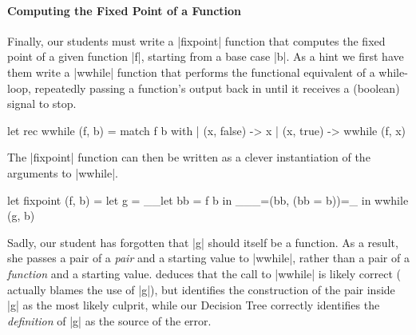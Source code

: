 \paragraph{Computing the Fixed Point of a Function}
Finally, our students must write a |fixpoint| function that computes the
fixed point of a given function |f|, starting from a base case |b|.
%
As a hint we first have them write a |wwhile| function that performs the
functional equivalent of a while-loop, repeatedly passing a function's
output back in until it receives a (boolean) signal to stop.
%
\begin{ecode}
  let rec wwhile (f, b) =
    match f b with
    | (x, false) -> x
    | (x, true)  -> wwhile (f, x)
\end{ecode}
\lstset{firstnumber=last}
%
The |fixpoint| function can then be written as a clever instantiation of
the arguments to |wwhile|.
%
\begin{ecode}
  let fixpoint (f, b) =
    let g = __let bb = f b in ___=(bb, (bb = b))=_ in
    wwhile (g, b)
\end{ecode}
\lstset{firstnumber=1}
%
Sadly, our student has forgotten that |g| should itself be a function.
%
As a result, she passes a pair of a \emph{pair} and a starting value to
|wwhile|, rather than a pair of a \emph{function} and a starting value.
%
\sherrloc deduces that the call to |wwhile| is likely correct (\ocaml
actually blames the use of |g|), but identifies the construction of the
pair inside |g| as the most likely culprit, while our Decision Tree
correctly identifies the \emph{definition} of |g| as the source of the
error.

